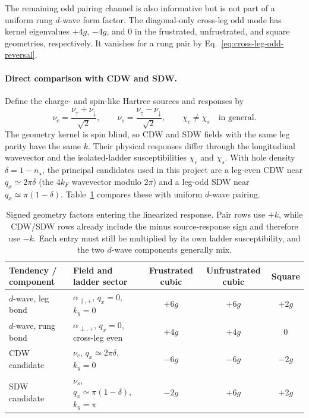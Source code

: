 \documentclass[11pt]{article}
\begin{document}
The remaining odd pairing channel is also informative but is not part of a
uniform rung \(d\)-wave form factor.  The diagonal-only cross-leg odd mode has
kernel eigenvalues \(+4g\), \(-4g\), and \(0\) in the frustrated,
unfrustrated, and square geometries, respectively.  It vanishes for a rung pair
by Eq.~\eqref{eq:cross-leg-odd-reversal}.

\paragraph{Direct comparison with CDW and SDW.}
Define the charge- and spin-like Hartree sources and responses by
\begin{equation}
 \nu_c=\frac{\nu_\uparrow+\nu_\downarrow}{\sqrt{2}},
 \qquad
 \nu_s=\frac{\nu_\uparrow-\nu_\downarrow}{\sqrt{2}},
 \qquad
 \chi_c\ne\chi_s\quad\text{in general}.
 \label{eq:charge-spin-fields}
\end{equation}
The geometry kernel is spin blind, so CDW and SDW fields with the same leg
parity have the same \(k\).  Their physical responses differ through the
longitudinal wavevector and the isolated-ladder susceptibilities \(\chi_c\) and
\(\chi_s\).  With hole density \(\delta=1-n_\star\), the principal candidates
used in this project are a leg-even CDW near
\(q_x\simeq2\pi\delta\) (the \(4k_F\) wavevector modulo \(2\pi\)) and a
leg-odd SDW near \(q_x\simeq\pi(1-\delta)\).  Table~\ref{tab:dwave-cdw-sdw}
compares these with uniform \(d\)-wave pairing.

\begin{table}[htbp]
\centering
\small
\begin{tabularx}{\textwidth}{@{}lXccc@{}}
\toprule
Tendency / component & Field and ladder sector
& Frustrated cubic & Unfrustrated cubic & Square \\
\midrule
\(d\)-wave, leg bond
& \(\alpha_{\parallel,+}\), \(q_x=0\), \(k_y=0\)
& \(+6g\) & \(+6g\) & \(+2g\) \\
\(d\)-wave, rung bond
& \(\alpha_{\perp,+}\), \(q_x=0\), cross-leg even
& \(+4g\) & \(+4g\) & \(0\) \\
CDW candidate
& \(\nu_c\), \(q_x\simeq2\pi\delta\), \(k_y=0\)
& \(-6g\) & \(-6g\) & \(-2g\) \\
SDW candidate
& \(\nu_s\), \(q_x\simeq\pi(1-\delta)\), \(k_y=\pi\)
& \(-2g\) & \(+6g\) & \(+2g\) \\
\bottomrule
\end{tabularx}
\caption{Signed geometry factors entering the linearized response.  Pair rows
use \(+k\), while CDW/SDW rows already include the minus source-response sign
and therefore use \(-k\).  Each entry must still be multiplied by its own
ladder susceptibility, and the two \(d\)-wave components generally mix.}
\label{tab:dwave-cdw-sdw}
\end{table}
\end{document}
